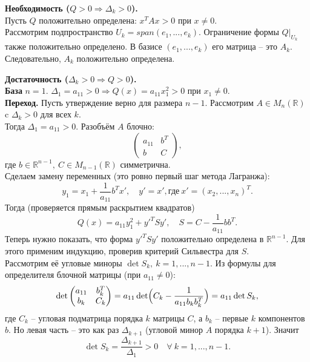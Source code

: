 \documentclass[14pt]{extreport}
\begin{document}
    \begin{prbox}
        \textbf{Необходимость ($Q>0 \Rightarrow \Delta_k>0$).}\\
        Пусть $Q$ положительно определена: $x^TAx > 0$ при $x \neq 0$.\\
        Рассмотрим подпространство $U_k = span(e_1,...,e_k)$. Ограничение формы $Q|_{U_k}$ также положительно определено. В базисе $(e_1,...,e_k)$ его матрица – это $A_k$. Следовательно, $A_k$ положительно определена.

        \textbf{Достаточность ($\Delta_k>0 \Rightarrow Q>0$).}\\
        \textbf{База} $n=1$. $\Delta_1 = a_{11} > 0 \Rightarrow Q(x) = a_{11}x_1^2 > 0$ при $x_1 \neq 0$.\\
        \textbf{Переход.} Пусть утверждение верно для размера $n-1$. Рассмотрим $A \in M_n(\mathbb{R})$ c $\Delta_k>0$ для всех $k$.\\
        Тогда $\Delta_1 = a_{11} > 0$. Разобъём $A$ блочно:
        \[
        \begin{pmatrix}
        a_{11} & b^T \\
        b & C
        \end{pmatrix},
        \]
        где $b \in \mathbb{R}^{n-1},\ C \in M_{n-1}(\mathbb{R})$ симметрична.\\
        Сделаем замену переменных (это ровно первый шаг метода Лагранжа):
        \[
        y_1 = x_1 + \frac{1}{a_{11}}b^Tx', \quad y' = x', \text{где}\ x' = (x_2,...,x_n)^T. 
        \]
        Тогда (проверяется прямым раскрытием квадратов)
        \[
        Q(x) = a_{11}y_1^2 + y'^TSy', \quad S = C - \frac{1}{a_{11}}bb^T.
        \]
        Теперь нужно показать, что форма $y'^TSy'$ положительно определена в $\mathbb{R}^{n-1}$. Для этого применим индукцию, проверив критерий Сильвестра для $S$.\\
        Рассмотрим её угловые миноры $\det S_k,\ k=1,...,n-1$. Из формулы для определителя блочной матрицы (при $a_{11} \neq 0$):
        \[
        \det
        \begin{pmatrix}
        a_{11} & b_k^T \\
        b_k & C_k
        \end{pmatrix}
        = a_{11} \det \Bigl( C_k - \frac{1}{a_{11}b_kb_k^T} \Bigr) = a_{11} \det S_k,
        \]
        где $C_k$ – угловая подматрица порядка $k$ матрицы $C$, а $b_k$ – первые $k$ компонентов $b$. Но левая часть – это как раз $\Delta_{k+1}$ (угловой минор $A$ порядка $k+1$). Значит
        \[
        \det S_k = \frac{\Delta_{k+1}}{\Delta_1} > 0 \quad \forall\ k = 1,...,n-1.
\]
\end{prbox}
\end{document}
